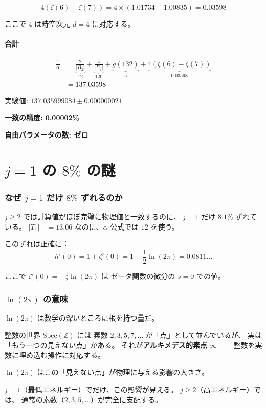 \documentclass[11pt,a4paper]{article}
\begin{document}
$$4(\zeta(6) - \zeta(7)) = 4 \times (1.01734 - 1.00835) = 0.03598$$

ここで $4$ は時空次元 $d = 4$ に対応する。

\subsection{合計}

\begin{resultbox}[微細構造定数の公式]
\begin{align*}
\frac{1}{\alpha} &= \underbrace{\frac{2}{|B_2|}}_{12} + \underbrace{\frac{4}{|B_4|}}_{120} + \underbrace{g(132)}_{5} + \underbrace{4(\zeta(6)-\zeta(7))}_{0.03598} \\[6pt]
&= 137.03598
\end{align*}

実験値: $137.035999084 \pm 0.000000021$

\textbf{一致の精度: 0.00002\%}

\textbf{自由パラメータの数: ゼロ}
\end{resultbox}

\part{$j = 1$ の $8\%$ の謎}

\section{なぜ $j = 1$ だけ $8\%$ ずれるのか}

$j \geq 2$ では計算値がほぼ完璧に物理値と一致するのに、
$j = 1$ だけ $8.1\%$ ずれている。
$|T_1|^{-1} = 13.06$ なのに、$\alpha$ 公式では $12$ を使う。

このずれは正確に：
$$h'(0) = 1 + \zeta'(0) = 1 - \frac{1}{2}\ln(2\pi) = 0.0811\ldots$$

ここで $\zeta'(0) = -\frac{1}{2}\ln(2\pi)$ は
ゼータ関数の微分の $s = 0$ での値。

\section{$\ln(2\pi)$ の意味}

$\ln(2\pi)$ は数学の深いところに根を持つ量だ。

\begin{storybox}[アラケロフ幾何学]
整数の世界 $\text{Spec}(\mathbb{Z})$ には
素数 $2, 3, 5, 7, \ldots$ が「点」として並んでいるが、
実は「もう一つの見えない点」がある。
それが\textbf{アルキメデス的素点} $\infty$——
整数を実数に埋め込む操作に対応する。

$\ln(2\pi)$ はこの「見えない点」が物理に与える影響の大きさ。

$j = 1$（最低エネルギー）でだけ、この影響が見える。
$j \geq 2$（高エネルギー）では、
通常の素数（$2, 3, 5, \ldots$）が完全に支配する。
\end{storybox}
\end{document}

